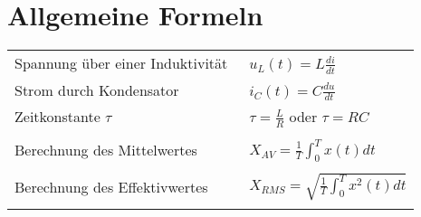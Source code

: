 \section{Allgemeine Formeln}

\begin{tabular}{ll}
  Spannung über einer Induktivität &\ $u_{L}(t) = L\frac{di}{dt}$\\
  Strom durch Kondensator &\ $i_{C}(t) = C\frac{du}{dt}$\\
  Zeitkonstante $\tau$ &\ $\tau = \frac{L}{R}$ oder $\tau = RC$\\\\
  Berechnung des Mittelwertes &\ $X_{AV} = \frac{1}{T}\int_{0}^{T}x(t)dt$\\\\
  Berechnung des Effektivwertes &\ $X_{RMS} = \sqrt{\frac{1}{T}\int_{0}^{T}x^2(t)dt}$\\\\
\end{tabular}
